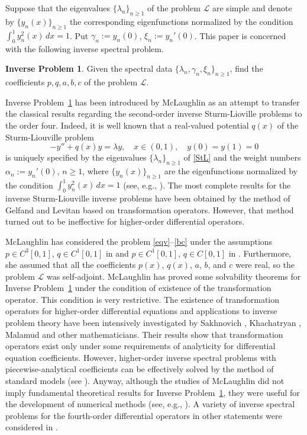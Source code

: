 \documentclass[a4paper,12pt]{article}
\newcommand{\al}{\alpha}
\newcommand{\ga}{\gamma}
\newcommand{\la}{\lambda}
\theoremstyle{plain}
\numberwithin{equation}{section}
\theoremstyle{definition}
\newtheorem{ip}[thm]{Inverse Problem}
\theoremstyle{remark}
\begin{document}
Suppose that the eigenvalues $\{ \la_n \}_{n \ge 1}$ of the problem $\mathcal L$ are simple and denote by $\{ y_n(x) \}_{n \ge 1}$ the corresponding eigenfunctions normalized by the condition $\int_0^1 y_n^2(x) \, dx = 1$. Put $\ga_n := y_n(0)$, $\xi_n := y_n'(0)$. This paper is concerned with the following inverse spectral problem.

\begin{ip} \label{ip:main}
Given the spectral data $\{ \la_n, \ga_n, \xi_n \}_{n \ge 1}$, find the coefficients $p, q, a, b, c$ of the problem $\mathcal L$.
\end{ip}

Inverse Problem~\ref{ip:main} has been introduced by McLaughlin \cite{McL82} as an attempt to transfer the classical results regarding the second-order inverse Sturm-Lioville problems to the order four. Indeed, it is well known that a real-valued potential $q(x)$ of the Sturm-Liouville problem 
\begin{equation} \label{StL}
-y'' + q(x) y = \la y, \quad x \in (0,1), \quad y(0) = y(1) = 0
\end{equation}
is uniquely specified by the eigenvalues $\{ \la_n \}_{n \ge 1}$ of \eqref{StL} and the weight numbers $\al_n := y_n'(0)$, $n \ge 1$, where $\{ y_n(x) \}_{n \ge 1}$ are the eigenfunctions normalized by the condition $\int_0^1 y_n^2(x) \, dx = 1$ (see, e.g., \cite{Mar77, Lev84, PT87, FY01}). The most complete results for the inverse Sturm-Liouville inverse problems have been obtained by the method of Gelfand and Levitan \cite{GL51} based on transformation operators. However, that method turned out to be ineffective for higher-order differential operators.

McLaughlin has considered the problem \eqref{eqv}--\eqref{bc} under the assumptions $p \in C^3[0,1]$, $q \in C^1[0,1]$ in \cite{McL82, McL86} and $p \in C^1[0,1]$, $q \in C[0,1]$ in \cite{McL84}. Furthermore, she assumed that all the coefficients $p(x)$, $q(x)$, $a$, $b$, and $c$ were real, so the problem $\mathcal L$ was self-adjoint. McLaughlin has proved some solvability theorems for Inverse Problem~\ref{ip:main} under the condition of existence of the transformation operator. This condition is very restrictive. The existence of transformation operators for higher-order differential equations and applications to inverse problem theory have been intensively investigated by Sakhnovich \cite{Sakh61, Sakh62}, Khachatryan \cite{Khach83}, Malamud \cite{Mal82, Mal90} and other mathematicians. Their results show that transformation operators exist only under some requirements of analyticity for differential equation coefficients. However, higher-order inverse spectral problems with piecewise-analytical coefficients can be effectively solved by the method of standard models (see \cite{Yur89, Yur00}). Anyway, although the studies of McLaughlin \cite{McL82, McL84, McL86} did not imply fundamental theoretical results for Inverse Problem~\ref{ip:main}, they were useful for the development of numerical methods (see, e.g., \cite{Glad86, Glad05}). A variety of inverse spectral problems for the fourth-order differential operators in other statements were considered in \cite{Bar74-1, Bar74-2, Iw88, PK97, CPS98, Pap04, Mor15, BK15, AZ19, PB20, JLX22}.
\end{document}
